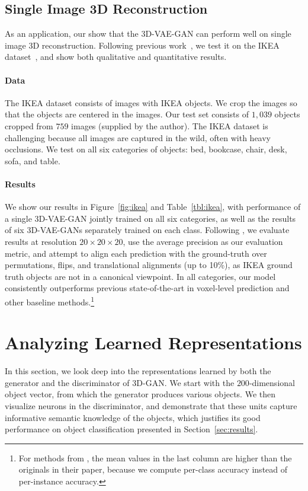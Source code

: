 \documentclass{article}
\newcommand{\sect}[1]{Section~\ref{#1}}
\newcommand{\fig}[1]{Figure~\ref{#1}}
\newcommand{\tbl}[1]{Table~\ref{#1}}
\newcommand{\model}{3D-GAN\xspace}
\newcommand{\vaemodel}{3D-VAE-GAN\xspace}
\newcommand{\vaemodels}{3D-VAE-GANs\xspace}
\newcommand{\myparagraph}[1]{\vspace{-10pt}\paragraph{#1}}
\newcommand{\presection}{\vspace{-8pt}}
\newcommand{\postsection}{\vspace{-8pt}}
\newcommand{\presubsection}{\vspace{-8pt}}
\newcommand{\postsubsection}{\vspace{-6pt}}
\begin{document}
\presubsection
\subsection{Single Image 3D Reconstruction}
\postsubsection

As an application, our show that the \vaemodel can perform well on single image 3D reconstruction. Following previous work~\citep{girdhar2016learning}, we test it on the IKEA dataset~\citep{ikea}, and show both qualitative and quantitative results.

\myparagraph{Data} 
The IKEA dataset consists of images with IKEA objects. We crop the images so that the objects are centered in the images. Our test set consists of $1,039$ objects cropped from $759$ images (supplied by the author). The IKEA dataset is challenging because all images are captured in the wild, often with heavy occlusions. We test on all six categories of objects: bed, bookcase, chair, desk, sofa, and table.

\myparagraph{Results} We show our results in \fig{fig:ikea} and \tbl{tbl:ikea}, with performance of a single \vaemodel jointly trained on all six categories, as well as the results of six \vaemodels separately trained on each class. Following \cite{girdhar2016learning}, we evaluate results at resolution $20\times20\times20$, use the average precision as our evaluation metric, and attempt to align each prediction with the ground-truth over permutations, flips, and translational alignments (up to 10\%), as IKEA ground truth objects are not in a canonical viewpoint. 
In all categories, our model consistently outperforms previous state-of-the-art in voxel-level prediction and other baseline methods.\footnote{For methods from \cite{girdhar2016learning}, the mean values in the last column are higher than the originals in their paper, because we compute per-class accuracy instead of per-instance accuracy.}

\presection
\section{Analyzing Learned Representations}
\label{sec:analysis}
\postsection

In this section, we look deep into the representations learned by both the generator and the discriminator of \model. We start with the $200$-dimensional object vector, from which the generator produces various objects. We then visualize neurons in the discriminator, and demonstrate that these units capture informative semantic knowledge of the objects, which justifies its good performance on object classification presented in \sect{sec:results}.
\end{document}
